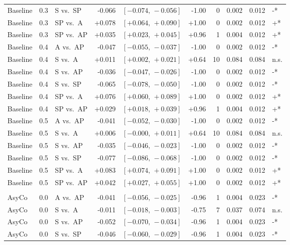 \begin{landscape}
\begin{scriptsize}
\begin{longtable}{lllrrrrrrl}
Baseline & 0.3 & S vs.\ SP & -0.066 & $[-0.074,\,-0.056]$ & -1.00 & 0 & 0.002 & 0.012 & -* \\
Baseline & 0.3 & SP vs.\ A & +0.078 & $[+0.064,\,+0.090]$ & +1.00 & 0 & 0.002 & 0.012 & +* \\
Baseline & 0.3 & SP vs.\ AP & +0.035 & $[+0.023,\,+0.045]$ & +0.96 & 1 & 0.004 & 0.012 & +* \\
Baseline & 0.4 & A vs.\ AP & -0.047 & $[-0.055,\,-0.037]$ & -1.00 & 0 & 0.002 & 0.012 & -* \\
Baseline & 0.4 & S vs.\ A & +0.011 & $[+0.002,\,+0.021]$ & +0.64 & 10 & 0.084 & 0.084 & n.s. \\
Baseline & 0.4 & S vs.\ AP & -0.036 & $[-0.047,\,-0.026]$ & -1.00 & 0 & 0.002 & 0.012 & -* \\
Baseline & 0.4 & S vs.\ SP & -0.065 & $[-0.078,\,-0.050]$ & -1.00 & 0 & 0.002 & 0.012 & -* \\
Baseline & 0.4 & SP vs.\ A & +0.076 & $[+0.060,\,+0.089]$ & +1.00 & 0 & 0.002 & 0.012 & +* \\
Baseline & 0.4 & SP vs.\ AP & +0.029 & $[+0.018,\,+0.039]$ & +0.96 & 1 & 0.004 & 0.012 & +* \\
Baseline & 0.5 & A vs.\ AP & -0.041 & $[-0.052,\,-0.030]$ & -1.00 & 0 & 0.002 & 0.012 & -* \\
Baseline & 0.5 & S vs.\ A & +0.006 & $[-0.000,\,+0.011]$ & +0.64 & 10 & 0.084 & 0.084 & n.s. \\
Baseline & 0.5 & S vs.\ AP & -0.035 & $[-0.046,\,-0.023]$ & -1.00 & 0 & 0.002 & 0.012 & -* \\
Baseline & 0.5 & S vs.\ SP & -0.077 & $[-0.086,\,-0.068]$ & -1.00 & 0 & 0.002 & 0.012 & -* \\
Baseline & 0.5 & SP vs.\ A & +0.083 & $[+0.074,\,+0.091]$ & +1.00 & 0 & 0.002 & 0.012 & +* \\
Baseline & 0.5 & SP vs.\ AP & +0.042 & $[+0.027,\,+0.055]$ & +1.00 & 0 & 0.002 & 0.012 & +* \\
\addlinespace
\multicolumn{10}{l}{\textit{Macro AUC}} \\
AsyCo & 0.0 & A vs.\ AP & -0.041 & $[-0.056,\,-0.025]$ & -0.96 & 1 & 0.004 & 0.023 & -* \\
AsyCo & 0.0 & S vs.\ A & -0.011 & $[-0.018,\,-0.003]$ & -0.75 & 7 & 0.037 & 0.074 & n.s. \\
AsyCo & 0.0 & S vs.\ AP & -0.052 & $[-0.070,\,-0.034]$ & -0.96 & 1 & 0.004 & 0.023 & -* \\
AsyCo & 0.0 & S vs.\ SP & -0.046 & $[-0.060,\,-0.029]$ & -0.96 & 1 & 0.004 & 0.023 & -* \\

\end{longtable}
\end{scriptsize}
\end{landscape}

